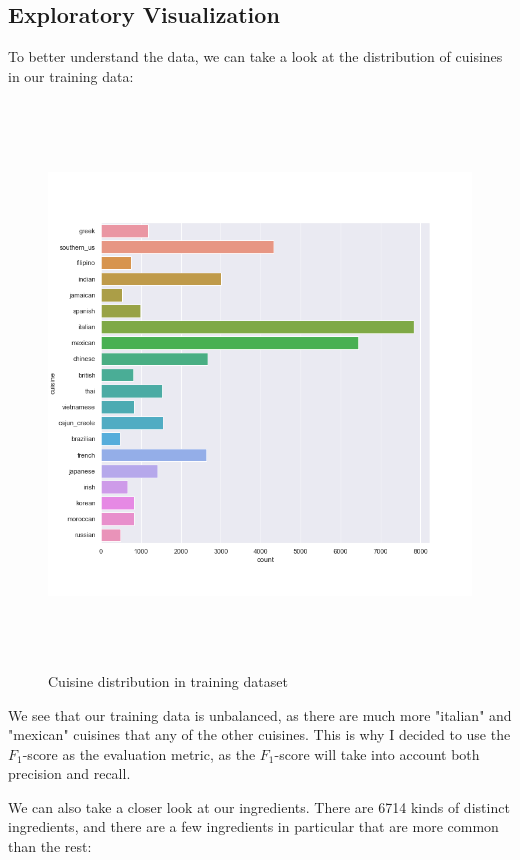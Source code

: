 \documentclass[12pt]{article}
\begin{document}
\subsection{Exploratory Visualization}

To better understand the data, we can take a look at the distribution of cuisines in our training data:

\begin{figure}[!h]
\includegraphics[width=\textwidth, height=15cm]{cuisine-distribution.png}
\caption{Cuisine distribution in training dataset}
\end{figure}

\noindent
We see that our training data is unbalanced, as there are much more "italian" and "mexican" cuisines that any of the other cuisines. This is why I decided to use the $F_1$-score as the evaluation metric, as the $F_1$-score will take into account both precision and recall.

We can also take a closer look at our ingredients. There are 6714 kinds of distinct ingredients, and there are a few ingredients in particular that are more common than the rest:
\end{document}

